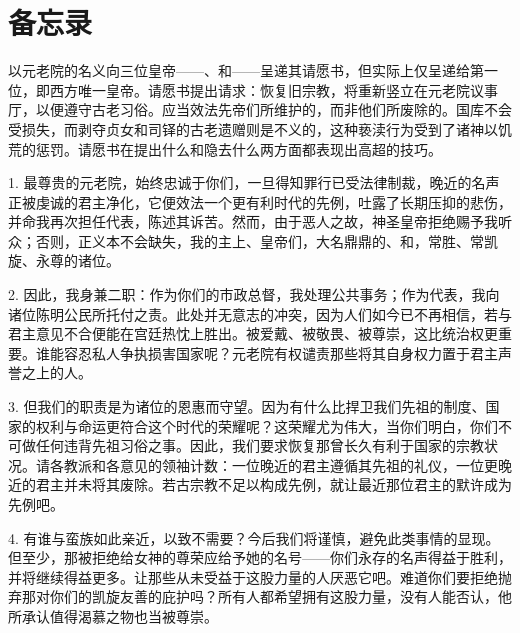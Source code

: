 
\chapter{备忘录}


以元老院的名义向三位皇帝——、和——呈递其请愿书，但实际上仅呈递给第一位，即西方唯一皇帝。请愿书提出请求：恢复旧宗教，将重新竖立在元老院议事厅，以便遵守古老习俗。应当效法先帝们所维护的，而非他们所废除的。国库不会受损失，而剥夺贞女和司铎的古老遗赠则是不义的，这种亵渎行为受到了诸神以饥荒的惩罚。请愿书在提出什么和隐去什么两方面都表现出高超的技巧。\par

1. 最尊贵的元老院，始终忠诚于你们，一旦得知罪行已受法律制裁，晚近的名声正被虔诚的君主净化，它便效法一个更有利时代的先例，吐露了长期压抑的悲伤，并命我再次担任代表，陈述其诉苦。然而，由于恶人之故，神圣皇帝拒绝赐予我听众；否则，正义本不会缺失，我的主上、皇帝们，大名鼎鼎的、和，常胜、常凯旋、永尊的诸位。\par

2. 因此，我身兼二职：作为你们的市政总督，我处理公共事务；作为代表，我向诸位陈明公民所托付之责。此处并无意志的冲突，因为人们如今已不再相信，若与君主意见不合便能在宫廷热忱上胜出。被爱戴、被敬畏、被尊崇，这比统治权更重要。谁能容忍私人争执损害国家呢？元老院有权谴责那些将其自身权力置于君主声誉之上的人。\par

3. 但我们的职责是为诸位的恩惠而守望。因为有什么比捍卫我们先祖的制度、国家的权利与命运更符合这个时代的荣耀呢？这荣耀尤为伟大，当你们明白，你们不可做任何违背先祖习俗之事。因此，我们要求恢复那曾长久有利于国家的宗教状况。请各教派和各意见的领袖计数：一位晚近的君主遵循其先祖的礼仪，一位更晚近的君主并未将其废除。若古宗教不足以构成先例，就让最近那位君主的默许成为先例吧。\par

4. 有谁与蛮族如此亲近，以致不需要？今后我们将谨慎，避免此类事情的显现。但至少，那被拒绝给女神的尊荣应给予她的名号——你们永存的名声得益于胜利，并将继续得益更多。让那些从未受益于这股力量的人厌恶它吧。难道你们要拒绝抛弃那对你们的凯旋友善的庇护吗？所有人都希望拥有这股力量，没有人能否认，他所承认值得渴慕之物也当被尊崇。\par

